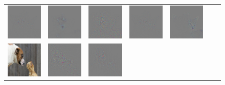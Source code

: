 \begin{figure}
\begin{center}
\begin{tabular}{ccccccc}
\includegraphics[width=0.14\linewidth,height=0.11\linewidth]{figs/examples/googlenet/deconv/dog-cat3_diff_188} &
\includegraphics[width=0.14\linewidth,height=0.11\linewidth]{figs/examples/googlenet/soft/dog-cat3_diff_188} &
\includegraphics[width=0.14\linewidth,height=0.11\linewidth]{figs/examples/googlenet/oxford/dog-cat3_diff_286} &
\includegraphics[width=0.14\linewidth,height=0.11\linewidth]{figs/examples/googlenet/deconv/dog-cat3_diff_286} &
\includegraphics[width=0.14\linewidth,height=0.11\linewidth]{figs/examples/googlenet/soft/dog-cat3_diff_286} \\
\vspace{-2.5pt}
\includegraphics[width=0.14\linewidth,height=0.11\linewidth]{figs/examples/googlenet/oxford/dog-cat4} &
\includegraphics[width=0.14\linewidth,height=0.11\linewidth]{figs/examples/googlenet/oxford/dog-cat4_diff_243} &
\includegraphics[width=0.14\linewidth,height=0.11\linewidth]{figs/examples/googlenet/deconv/dog-cat4_diff_243} &

\end{tabular}
\end{center}
\end{figure}
